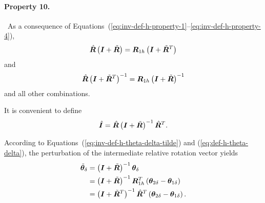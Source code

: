 \documentclass[10pt,dvips,fleqn,subeqn]{report}
\newcommand{\T}[1]{\bm{#1}}
\begin{document}
\paragraph{Property 10.} \
As a consequence
of Equations~(\ref{eq:inv-def-h-property-1}--\ref{eq:inv-def-h-property-4}),
\begin{equation}
	\hat{\T{R}} \plbr{\T{I} + \tilde{\T{R}}} 
	= \T{R}_{1h} \plbr{\T{I} + \tilde{\T{R}}^T}
\end{equation}
and
\begin{equation}
	\hat{\T{R}} \plbr{\T{I} + \tilde{\T{R}}^T}^{-1}
	= \T{R}_{1h} \plbr{\T{I} + \tilde{\T{R}}}^{-1}
\end{equation}
and all other combinations.

\bigskip

It is convenient to define
\begin{equation}
	\hat{\T{I}} =
		\hat{\T{R}} \plbr{\T{I} + \tilde{\T{R}}}^{-1} \hat{\T{R}}^T .
\end{equation}

According to Equations~(\ref{eq:inv-def-h-theta-delta-tilde})
and (\ref{eq:def-h-theta-delta}),
the perturbation of the intermediate relative rotation vector yields
\begin{align}
	\tilde{\T{\theta}}_{\delta}
	&= \plbr{\T{I} + \tilde{\T{R}}}^{-1} \T{\theta}_{\delta} \nonumber \\
	&= \plbr{\T{I} + \tilde{\T{R}}}^{-1}
		\T{R}_{1h}^T\plbr{\T{\theta}_{2\delta} - \T{\theta}_{1\delta}} \nonumber \\
	&= \plbr{\T{I} + \tilde{\T{R}}^T}^{-1}
		\hat{\T{R}}^T\plbr{\T{\theta}_{2\delta} - \T{\theta}_{1\delta}} .
\end{align}
\end{document}

